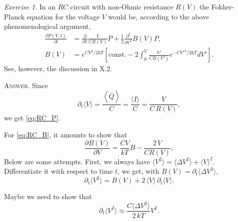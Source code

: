 \documentclass{book}
\numberwithin{equation}{section}
\theoremstyle{plain}
\theoremstyle{definition}
\theoremstyle{remark}
\theoremstyle{BoldStyle}
\newtheorem{exercise}{Exercise}
\numberwithin{exercise}{section}
\newcommand{\answer}[1]{{\color{DarkBlue}\footnotesize \textsc{Answer.} #1}}
\begin{document}
\begin{exercise}
  In an $RC$ circuit with non-Ohmic resistance $R(V)$
  the Fokker-Planck equation for the voltage $V$ would be,
  according to the above phenomenological argument,
  \begin{subequations}
    \begin{align}
    \frac{ \partial P(V, t) } { \partial t }
    &=
    \frac{ \partial }{ \partial V}
    \frac{ V } { C R(V) }
    P
    +
    \frac 1 2
    \frac{ \partial^2 } { \partial V^2 } B(V) P,
    \label{eq:RC_P}
    \\
    B(V) &=
    e^{CV^2/2kT}
    \left[
      \mathrm{const.}
      -
      2
      \int_0^V
      \frac{ V' } { CR(V')}
      e^{-CV'^2/2kT} dV'
    \right].
    \label{eq:RC_B}
    \end{align}
  \end{subequations}
  See, however, the discussion in X.2.

  \answer{
    Since
    $$\partial_t \langle V \rangle
    = \frac{ \left\langle \dot Q \right\rangle }{ C }
    = \frac{ \langle I \rangle }{ C  }= \frac{V}{C \, R(V)},
    $$
    we get \eqref{eq:RC_P}.

    For \eqref{eq:RC_B},
    it amounts to show that
    $$
    \frac{ \partial B(V) } { \partial V }
    = \frac{ CV}{kT} B - \frac{ 2 \, V }{ C R(V) },
    $$
    Below are some attempts.
    First, we always have
    $\langle V^2 \rangle = \langle \Delta V^2 \rangle + \langle V\rangle^2$.
    Differentiate it with respect to time $t$, we get,
    with $B(V) = \partial_t \langle \Delta V^2 \rangle$,
    $$
    \partial_t \langle V^2 \rangle
    = B(V) + 2 \, \langle V \rangle \, \partial_t \langle V \rangle.
    $$

    Maybe we need to show that
    $$
    \partial_t \langle V^2 \rangle
    \approx
    \frac{ C \langle \Delta V^2 \rangle } { 2 \, kT } V^2.
    $$
  }
\end{exercise}
\end{document}

